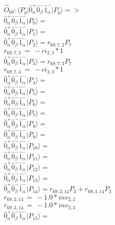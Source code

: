 \documentclass[14pt]{article}
\begin{document}
    $\hat{O}_{69}:  \langle{P_p}\vert \hat{0}_{\alpha}^{+}\hat{0}_{\beta}^{-}\hat{1}_{\alpha}^{-} \vert{P_q}\rangle => $ \\ 
    $ \hat{0}_{\alpha}^{+}\hat{0}_{\beta}^{-}\hat{1}_{\alpha}^{-} \vert{P_{0}}\rangle =  $ \\ 
    $ \hat{0}_{\alpha}^{+}\hat{0}_{\beta}^{-}\hat{1}_{\alpha}^{-} \vert{P_{1}}\rangle =  $ \\ 
    $ \hat{0}_{\alpha}^{+}\hat{0}_{\beta}^{-}\hat{1}_{\alpha}^{-} \vert{P_{2}}\rangle = {r}_{69,7,2}P_{7} $ \\ 
    ${r}_{69,7,2}\ =\ -{ci}_{2,3}*1 $ \\ 
    $ \hat{0}_{\alpha}^{+}\hat{0}_{\beta}^{-}\hat{1}_{\alpha}^{-} \vert{P_{3}}\rangle = {r}_{69,7,3}P_{7} $ \\ 
    ${r}_{69,7,3}\ =\ -{ci}_{3,3}*1 $ \\ 
    $ \hat{0}_{\alpha}^{+}\hat{0}_{\beta}^{-}\hat{1}_{\alpha}^{-} \vert{P_{4}}\rangle =  $ \\ 
    $ \hat{0}_{\alpha}^{+}\hat{0}_{\beta}^{-}\hat{1}_{\alpha}^{-} \vert{P_{5}}\rangle =  $ \\ 
    $ \hat{0}_{\alpha}^{+}\hat{0}_{\beta}^{-}\hat{1}_{\alpha}^{-} \vert{P_{6}}\rangle =  $ \\ 
    $ \hat{0}_{\alpha}^{+}\hat{0}_{\beta}^{-}\hat{1}_{\alpha}^{-} \vert{P_{7}}\rangle =  $ \\ 
    $ \hat{0}_{\alpha}^{+}\hat{0}_{\beta}^{-}\hat{1}_{\alpha}^{-} \vert{P_{8}}\rangle =  $ \\ 
    $ \hat{0}_{\alpha}^{+}\hat{0}_{\beta}^{-}\hat{1}_{\alpha}^{-} \vert{P_{9}}\rangle =  $ \\ 
    $ \hat{0}_{\alpha}^{+}\hat{0}_{\beta}^{-}\hat{1}_{\alpha}^{-} \vert{P_{10}}\rangle =  $ \\ 
    $ \hat{0}_{\alpha}^{+}\hat{0}_{\beta}^{-}\hat{1}_{\alpha}^{-} \vert{P_{11}}\rangle =  $ \\ 
    $ \hat{0}_{\alpha}^{+}\hat{0}_{\beta}^{-}\hat{1}_{\alpha}^{-} \vert{P_{12}}\rangle =  $ \\ 
    $ \hat{0}_{\alpha}^{+}\hat{0}_{\beta}^{-}\hat{1}_{\alpha}^{-} \vert{P_{13}}\rangle =  $ \\ 
    $ \hat{0}_{\alpha}^{+}\hat{0}_{\beta}^{-}\hat{1}_{\alpha}^{-} \vert{P_{14}}\rangle = {r}_{69,2,14}P_{2}+{r}_{69,3,14}P_{3} $ \\ 
    ${r}_{69,2,14}\ =\ -1.0*{inv}_{2,2} $ \\ 
    ${r}_{69,3,14}\ =\ -1.0*{inv}_{2,3} $ \\ 
    $ \hat{0}_{\alpha}^{+}\hat{0}_{\beta}^{-}\hat{1}_{\alpha}^{-} \vert{P_{15}}\rangle =  $ \\ 
    
\end{document}
